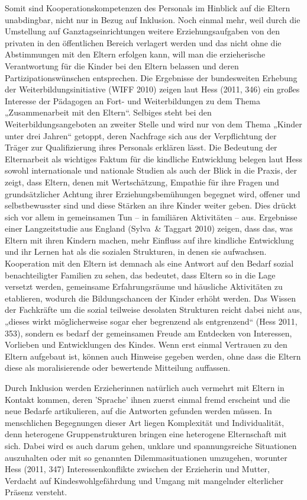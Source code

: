 Somit sind Kooperationskompetenzen des Personals im Hinblick auf die Eltern unabdingbar, nicht nur in Bezug auf Inklusion. 
Noch einmal mehr, weil durch die Umstellung auf Ganztagseinrichtungen weitere Erziehungsaufgaben von den privaten in den öffentlichen Bereich verlagert werden und das nicht ohne die Abstimmungen mit den Eltern erfolgen kann, will man die erzieherische Verantwortung für die Kinder bei den Eltern belassen und deren Partizipationswünschen entsprechen. Die Ergebnisse der bundesweiten Erhebung der Weiterbildungsinitiative (WIFF 2010) zeigen laut Hess (2011, 346) ein großes Interesse der Pädagogen an Fort- und Weiterbildungen zu dem Thema „Zusammenarbeit mit den Eltern“. Selbiges steht bei den Weiterbildungsangeboten an zweiter Stelle und wird nur von dem Thema „Kinder unter drei Jahren“ getoppt, deren Nachfrage sich aus der Verpflichtung der Träger zur Qualifizierung ihres Personals erklären lässt. Die Bedeutung der Elternarbeit als wichtiges Faktum für die kindliche Entwicklung belegen laut Hess sowohl internationale und nationale Studien als auch der Blick in die Praxis, der zeigt, dass Eltern, denen mit Wertschätzung, Empathie für ihre Fragen und grundsätzlicher Achtung ihrer Erziehungsbemühungen begegnet wird, offener und selbstbewusster sind und diese Stärken an ihre Kinder weiter geben. Dies drückt sich vor allem in gemeinsamen Tun -- in familiären Aktivitäten -- aus. 
Ergebnisse einer Langzeitstudie aus England (Sylva~\& Taggart 2010) zeigen, dass das, was Eltern mit ihren Kindern machen, mehr Einfluss auf ihre kindliche Entwicklung und ihr Lernen hat als die sozialen Strukturen, in denen sie aufwachsen.  
Kooperation mit den Eltern ist demnach als eine Antwort auf den Bedarf sozial benachteiligter Familien zu sehen, das bedeutet, dass Eltern so in die Lage versetzt werden, gemeinsame Erfahrungsräume und häusliche Aktivitäten zu etablieren, wodurch die Bildungschancen der Kinder erhöht werden. Das Wissen der Fachkräfte um die sozial teilweise desolaten Strukturen reicht dabei nicht aus, „dieses wirkt möglicherweise sogar eher begrenzend als entgrenzend“ (Hess 2011, 353), sondern es bedarf der gemeinsamen Freude am Entdecken von Interessen, Vorlieben und Entwicklungen des Kindes. Wenn erst einmal Vertrauen zu den Eltern aufgebaut ist, können auch Hinweise gegeben werden, ohne dass die Eltern diese als moralisierende oder bewertende Mitteilung auffassen.

Durch Inklusion werden Erzieherinnen natürlich auch vermehrt mit Eltern in Kontakt kommen, deren 'Sprache' ihnen zuerst einmal fremd erscheint und die neue Bedarfe artikulieren, auf die Antworten gefunden werden müssen. In menschlichen Begegnungen dieser Art liegen Komplexität und Individualität, denn heterogene Gruppenstrukturen bringen eine heterogene Elternschaft mit sich. Dabei wird es auch darum gehen, unklare und spannungsreiche Situationen auszuhalten oder mit so genannten Dilemmasituationen umzugehen, worunter Hess (2011, 347) Interessenkonflikte zwischen der Erzieherin und Mutter, Verdacht auf Kindeswohlgefährdung und Umgang mit mangelnder elterlicher Präsenz versteht. 

